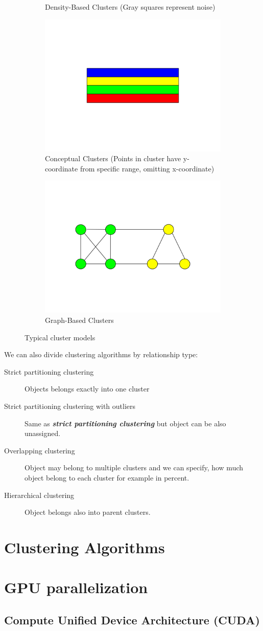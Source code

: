 \begin{figure}[h]
\begin{subfigure}{.5\textwidth}
  \caption{Density-Based Clusters (Gray squares represent noise)}
  \label{fig:densityClusters}
\end{subfigure}%
\vspace*{0.5cm} 
\begin{subfigure}{.5\textwidth}
  \centering
  \includegraphics[width=.5\linewidth]{img/conceptualClusters.png}
  \caption{Conceptual Clusters (Points in cluster have y-coordinate from specific range, omitting x-coordinate)}
  \label{fig:conceptualClusters}
\end{subfigure}%
\begin{subfigure}{.5\textwidth}
  \centering
  \includegraphics[width=.5\linewidth]{img/graphClusters.png}
  \caption{Graph-Based Clusters}
  \label{fig:graphClusters}
\end{subfigure}%
\caption{Typical cluster models}
\end{figure}

We can also divide clustering algorithms by relationship type:

\begin{description}
\item[Strict partitioning clustering] Objects belongs exactly into one cluster
\item[Strict partitioning clustering with outliers] Same as \textit{\textbf{strict partitioning clustering}} but object can be also unassigned. 
\item[Overlapping clustering] Object may belong to multiple clusters and we can specify, how much object belong to each cluster for example in percent.
\item[Hierarchical clustering] Object belongs also into parent clusters.
\end{description}

\section{Clustering Algorithms} \label{sec:clusteringAlgorithms}
 
\section{GPU parallelization}
\subsection{Compute Unified Device Architecture (CUDA)}